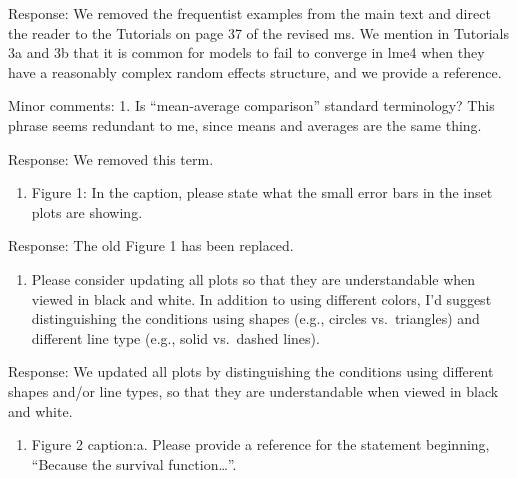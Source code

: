 \documentclass[
]{article}
\providecommand{\tightlist}{%
  \setlength{\itemsep}{0pt}\setlength{\parskip}{0pt}}
\renewenvironment{quote}{\begin{leftbar}}{\end{leftbar}}
\begin{document}
Response: We removed the frequentist examples from the main text and
direct the reader to the Tutorials on page 37 of the revised ms. We
mention in Tutorials 3a and 3b that it is common for models to fail to
converge in lme4 when they have a reasonably complex random effects
structure, and we provide a reference.

\begin{quote}
Minor comments: 1. Is ``mean-average comparison'' standard terminology?
This phrase seems redundant to me, since means and averages are the same
thing.
\end{quote}

Response: We removed this term.

\begin{quote}
\begin{enumerate}
\def\labelenumi{\arabic{enumi}.}
\setcounter{enumi}{1}
\tightlist
\item
  Figure 1: In the caption, please state what the small error bars in
  the inset plots are showing.
\end{enumerate}
\end{quote}

Response: The old Figure 1 has been replaced.

\begin{quote}
\begin{enumerate}
\def\labelenumi{\arabic{enumi}.}
\setcounter{enumi}{2}
\tightlist
\item
  Please consider updating all plots so that they are understandable
  when viewed in black and white. In addition to using different colors,
  I'd suggest distinguishing the conditions using shapes (e.g., circles
  vs.~triangles) and different line type (e.g., solid vs.~dashed lines).
\end{enumerate}
\end{quote}

Response: We updated all plots by distinguishing the conditions using
different shapes and/or line types, so that they are understandable when
viewed in black and white.

\begin{quote}
\begin{enumerate}
\def\labelenumi{\arabic{enumi}.}
\setcounter{enumi}{3}
\tightlist
\item
  Figure 2 caption:a. Please provide a reference for the statement
  beginning, ``Because the survival function\ldots{}''.
\end{enumerate}
\end{quote}
\end{document}
